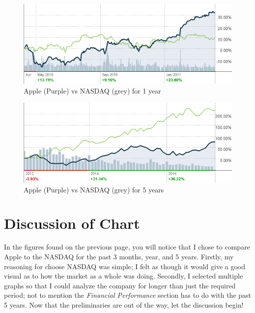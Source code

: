 \documentclass[12pt,a4paper,titlepage]{article}
\begin{document}
\begin{figure}[!htb]
  \centering
  \includegraphics[width=1\textwidth]{apple-chart-1yr}
    \caption{Apple (Purple) vs NASDAQ (grey) for 1 year~\cite{cnnapple}}
\end{figure}

\begin{figure}[!htb]
  \centering
  \includegraphics[width=1\textwidth]{apple-chart-5yr}
    \caption{Apple (Purple) vs NASDAQ (grey) for 5 years~\cite{cnnapple}}
\end{figure}

\newpage

\section{Discussion of Chart}
In the figures found on the previous page, you will notice that I chose to
compare Apple to the NASDAQ for the past 3 months, year, and 5 years. Firstly,
my reasoning for choose NASDAQ was simple; I felt as though it would give a
good visual as to how the market as a whole was doing. Secondly, I selected
multiple graphs so that I could analyze the company for longer than just the
required period; not to mention the \emph{Financial Performance} section has to
do with the past 5 years. Now that the preliminaries are out of the way, let the
discussion begin!
\end{document}
